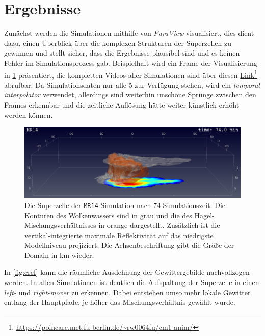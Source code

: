 \section{Ergebnisse}


Zunächst werden die Simulationen mithilfe von \textit{ParaView} visualisiert, dies dient dazu, einen Überblick über die komplexen Strukturen der Superzellen zu gewinnen und stellt sicher, dass die Ergebnisse plausibel sind und es keinen Fehler im Simulationsprozess gab. Beispielhaft wird ein Frame der Visualisierung in \cref{fig:singleframe} präsentiert, die kompletten Videos aller Simulationen sind über diesen \href{https://poincare.met.fu-berlin.de/~rw0064fu/cm1-anim/}{Link}\footnote{\hypersetup{urlcolor=}\url{https://poincare.met.fu-berlin.de/~rw0064fu/cm1-anim/}} abrufbar. Da Simulationsdaten nur alle \SI{5}{\min} zur Verfügung stehen, wird ein \textit{temporal interpolator} verwendet, allerdings sind weiterhin unschöne Sprünge zwischen den Frames erkennbar und die zeitliche Auflösung hätte weiter künstlich erhöht werden können.

\begin{figure}
	\centering
	\includegraphics[width=\linewidth]{../figs/MR14-fig.0037.png}
	\caption{Die Superzelle der \texttt{MR14}-Simulation nach \SI{74}{\min} Simulationszeit. Die Konturen des Wolkenwassers sind in grau und die des Hagel-Mischungsverhältnisses in orange dargestellt. Zusätzlich ist die vertikal-integrierte maximale Reflektivität auf das niedrigste Modellniveau projiziert. Die Achsenbeschriftung gibt die Größe der Domain in \si{\km} wieder.}
	\label{fig:singleframe}
\end{figure}

In \cref{fig:cref} kann die räumliche Ausdehnung der Gewittergebilde nachvollzogen werden. In allen Simulationen ist deutlich die Aufspaltung der Superzelle in einen \textit{left-} und \textit{right-mover} zu erkennen. Dabei entstehen umso mehr lokale Gewitter entlang der Hauptpfade, je höher das Mischungsverhältnis gewählt wurde.

